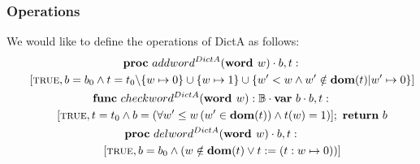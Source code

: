 \documentclass[a4paper,12pt,fleqn]{scrartcl}
\newcommand{\domt}{\textbf{dom}(t)}
\newcommand{\WORD}{\textbf{word }}
\begin{document}
\subsubsection{Operations}
We would like to define the operations of DictA as follows:
\begin{gather*}
    \PROC\ addword^{DictA}(\WORD w)\cdot b, t:\\
        \qquad [\True, b = b_0\And t = {t_0\backslash\{w\mapsto 0 \} \cup\{w\mapsto 1\}\cup\{w' < w\And 
                    w'\notin \domt | w'\mapsto 0\}}]\\ 
    \FUNC\ checkword^{DictA}(\WORD w):\mathbb{B}\cdot
        \VAR\ b\cdot b, t:\\
        \qquad[\True, t = t_0\And b = (\All{w' \leq w}{w'\in \domt} \And t(w)=1)];\ \RETURN\ b\\
    \PROC\ delword^{DictA}(\WORD w)\cdot b, t:\\
        \qquad[\True , b = b_0\And
        (w \notin \domt \OR t\Ass(t: w \mapsto 0))]\\ 
\end{gather*} 
\end{document}
